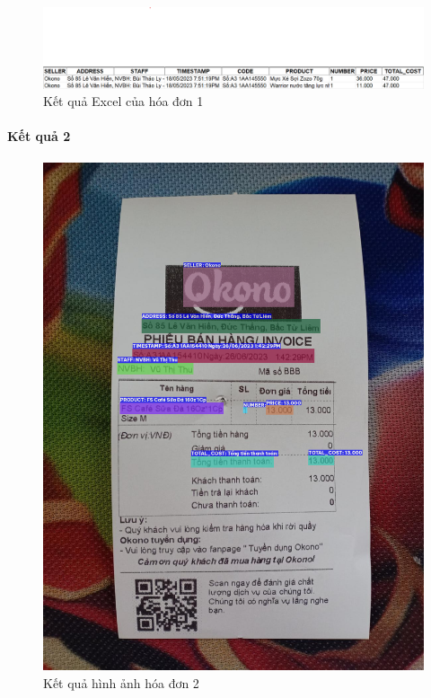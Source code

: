 \begin{figure}[h]
    \includegraphics[scale=0.312]{images/result-demi-1.png}
    \caption{Kết quả Excel của hóa đơn 1}
\end{figure}

\paragraph*{Kết quả 2}
\begin{figure}[h]
    \includegraphics[scale=0.2]{images/demo-image-1.png}
    \centering
    \caption{Kết quả hình ảnh hóa đơn 2}
\end{figure}

